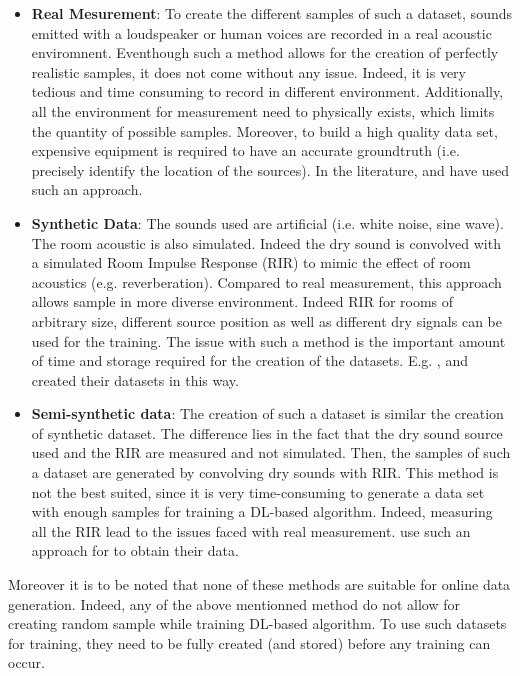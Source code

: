 \documentclass{article}
\begin{document}
\begin{itemize}
    \item \textbf{Real Mesurement}: To create the different samples of such a dataset, sounds emitted with a loudspeaker or human voices are recorded in a real acoustic enviromnent. Eventhough such a method allows for the creation of perfectly realistic samples, it does not come without any issue. Indeed, it is very tedious and time consuming to record in different environment. Additionally, all the environment for measurement need to physically exists, which limits the quantity of possible samples. Moreover, to build a high quality data set, expensive equipment is required to have an accurate groundtruth (i.e. precisely identify the location of the sources). In the literature, \cite{he2018deep} and \cite{ferguson2018sound} have used such an approach.
    \item \textbf{Synthetic Data}: The sounds used are artificial (i.e. white noise, sine wave). The room acoustic is also simulated. Indeed the dry sound is convolved with a simulated Room Impulse Response (RIR) to mimic the effect of room acoustics (e.g. reverberation). Compared to real measurement, this approach allows sample in more diverse environment. Indeed RIR for rooms of arbitrary size, different source position as well as different dry signals can be used for the training. The issue with such a method is the important amount of time and storage required for the creation of the datasets. E.g. \cite{chakrabarty2017broadband}, \cite{perotin2018crnn} and \cite{adavanne2018direction} created their datasets in this way.
    \item \textbf{Semi-synthetic data}: The creation of such a dataset is similar the creation of synthetic dataset. The difference lies in the fact that the dry sound source used and the RIR are measured and not simulated. Then, the samples of such a dataset are generated by convolving dry sounds with RIR. This method is not the best suited, since it is very time-consuming to generate a data set with enough samples for training a DL-based algorithm. Indeed, measuring all the RIR lead to the issues faced with real measurement. \cite{takeda2016sound} use such an approach for to obtain their data.
\end{itemize}

Moreover it is to be noted that none of these methods are suitable for online data generation. Indeed, any of the above mentionned method do not allow for creating random sample while training DL-based algorithm. To use such datasets for training, they need to be fully created (and stored) before any training can occur.
\end{document}
